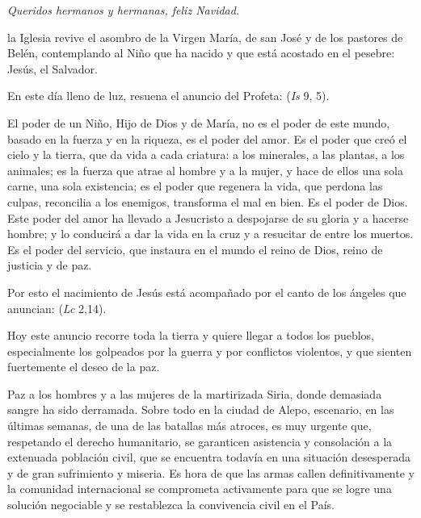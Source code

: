 \begin{body}
	\emph{Queridos hermanos y hermanas, feliz Navidad}.
	
	 la Iglesia revive el asombro de la Virgen María, de san José y de los pastores de Belén, contemplando al Niño que ha nacido y que está acostado en el pesebre: Jesús, el Salvador.
	
	En este día lleno de luz, resuena el anuncio del Profeta:  (\emph{Is} 9, 5).
	
	El poder de un Niño, Hijo de Dios y de María, no es el poder de este mundo, basado en la fuerza y en la riqueza, es el poder del amor. Es el poder que creó el cielo y la tierra, que da vida a cada criatura: a los minerales, a las plantas, a los animales; es la fuerza que atrae al hombre y a la mujer, y hace de ellos una sola carne, una sola existencia; es el poder que regenera la vida, que perdona las culpas, reconcilia a los enemigos, transforma el mal en bien. Es el poder de Dios. Este poder del amor ha llevado a Jesucristo a despojarse de su gloria y a hacerse hombre; y lo conducirá a dar la vida en la cruz y a resucitar de entre los muertos. Es el poder del servicio, que instaura en el mundo el reino de Dios, reino de justicia y de paz.
	
	Por esto el nacimiento de Jesús está acompañado por el canto de los ángeles que anuncian:  (\emph{Lc} 2,14).
	
	Hoy este anuncio recorre toda la tierra y quiere llegar a todos los pueblos, especialmente los golpeados por la guerra y por conflictos violentos, y que sienten fuertemente el deseo de la paz.
	
	Paz a los hombres y a las mujeres de la martirizada Siria, donde demasiada sangre ha sido derramada. Sobre todo en la ciudad de Alepo, escenario, en las últimas semanas, de una de las batallas más atroces, es muy urgente que, respetando el derecho humanitario, se garanticen asistencia y consolación a la extenuada población civil, que se encuentra todavía en una situación desesperada y de gran sufrimiento y miseria. Es hora de que las armas callen definitivamente y la comunidad internacional se comprometa activamente para que se logre una solución negociable y se restablezca la convivencia civil en el País.
	

\end{body}
